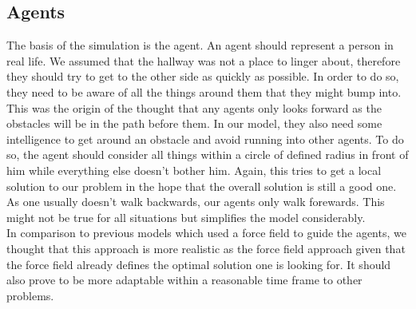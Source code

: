 \subsection{Agents}
The basis of the simulation is the agent. An agent should represent a person in real life. We assumed that the hallway was not a place to linger about, therefore they should try to get to the other side as quickly as possible. In order to do so, they need to be aware of all the things around them that they might bump into. This was the origin of the thought that any agents only looks forward as the obstacles will be in the path before them. In our model, they also need some intelligence to get around an obstacle and avoid running into other agents. To do so, the agent should consider all things within a circle of defined radius in front of him while everything else doesn't bother him. Again, this tries to get a local solution to our problem in the hope that the overall solution is still a good one. As one usually doesn't walk backwards, our agents only walk forewards. This might not be true for all situations but simplifies the model considerably.\\

\noi In comparison to previous models which used a force field to guide the agents, we thought that this approach is more realistic as the force field approach given that the force field already defines the optimal solution one is looking for. It should also prove to be more adaptable within a reasonable time frame to other problems.


